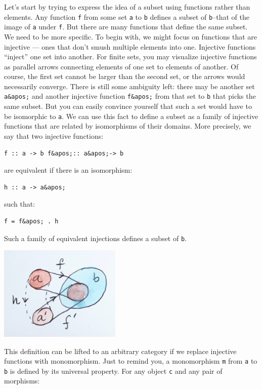 Let's start by trying to express the idea of a subset using functions
rather than elements. Any function \texttt{f} from some set \texttt{a}
to \texttt{b} defines a subset of \texttt{b}--that of the image of
\texttt{a} under \texttt{f}. But there are many functions that define
the same subset. We need to be more specific. To begin with, we might
focus on functions that are injective --- ones that don't smush multiple
elements into one. Injective functions ``inject'' one set into another.
For finite sets, you may visualize injective functions as parallel
arrows connecting elements of one set to elements of another. Of course,
the first set cannot be larger than the second set, or the arrows would
necessarily converge. There is still some ambiguity left: there may be
another set \texttt{a\&apos;} and another injective function
\texttt{f\&apos;} from that set to \texttt{b} that picks the same
subset. But you can easily convince yourself that such a set would have
to be isomorphic to \texttt{a}. We can use this fact to define a subset
as a family of injective functions that are related by isomorphisms of
their domains. More precisely, we say that two injective functions:

\begin{verbatim}
f :: a -> b f&apos;:: a&apos;-> b
\end{verbatim}

are equivalent if there is an isomorphism:

\begin{verbatim}
h :: a -> a&apos;
\end{verbatim}

such that:

\begin{verbatim}
f = f&apos; . h
\end{verbatim}

Such a family of equivalent injections defines a subset of \texttt{b}.

\includegraphics[width=2.29167in]{images/subsetinjection.jpg}

This definition can be lifted to an arbitrary category if we replace
injective functions with monomorphism. Just to remind you, a
monomorphism \texttt{m} from \texttt{a} to \texttt{b} is defined by its
universal property. For any object \texttt{c} and any pair of morphisms:

